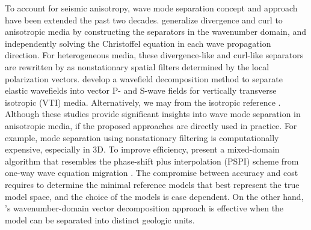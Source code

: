 To account for seismic anisotropy, wave mode separation concept and approach have been extended the past two decades. 
\cite {dellinger.etgen:1990} generalize divergence and curl to anisotropic media by constructing the separators in the
wavenumber domain, and independently solving the Christoffel equation in each wave propagation direction.
For heterogeneous media, these divergence-like and curl-like separators are rewritten by \cite{yan.sava:2009} as nonstationary spatial filters
 determined by the local polarization vectors. 
\cite{zhang.mcmechan:2010} develop a wavefield decomposition method to separate elastic wavefields into vector P- and S-wave fields
for vertically transverse isotropic (VTI) media.
Alternatively, we may 
from the isotropic reference \cite[]{cheng.kang:2012,cheng.kang:2013}.
Although these studies provide significant insights into wave mode separation in anisotropic media,
if the proposed approaches are directly used in practice.
For example, mode separation using nonstationary filtering is computationally expensive, especially in 3D.
To improve efficiency, \cite {yan.sava:2011} present a mixed-domain algorithm that resembles the phase-shift plus interpolation (PSPI) scheme
 from one-way wave equation migration \cite[]{gazdag:1984}.
The compromise between accuracy and cost requires to determine the minimal reference models
 that best represent the true model space, and the choice of the models is case dependent. On the other hand, \cite{zhang.mcmechan:2010}'s
 wavenumber-domain vector decomposition approach is effective when the model can be separated into distinct geologic units.

